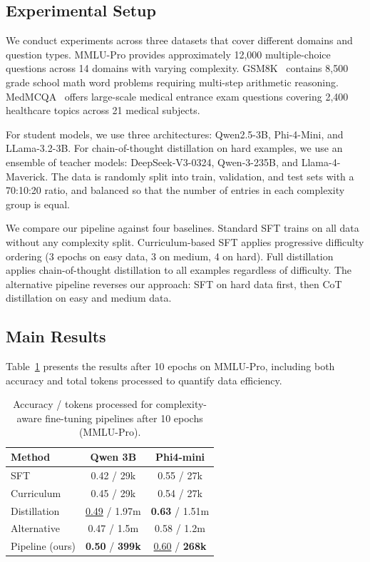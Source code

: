 \subsection{Experimental Setup}

We conduct experiments across three datasets that cover different domains and question types. MMLU-Pro provides approximately 12,000 multiple-choice questions across 14 domains with varying complexity. GSM8K~\cite{cobbe2021gsm8k} contains 8,500 grade school math word problems requiring multi-step arithmetic reasoning. MedMCQA~\cite{pmlr-v174-pal22a} offers large-scale medical entrance exam questions covering 2,400 healthcare topics across 21 medical subjects.

For student models, we use three architectures: Qwen2.5-3B, Phi-4-Mini, and LLama-3.2-3B. For chain-of-thought distillation on hard examples, we use an ensemble of teacher models: DeepSeek-V3-0324, Qwen-3-235B, and Llama-4-Maverick. The data is randomly split into train, validation, and test sets with a 70:10:20 ratio, and balanced so that the number of entries in each complexity group is equal.

We compare our pipeline against four baselines. Standard SFT trains on all data without any complexity split. Curriculum-based SFT applies progressive difficulty ordering (3 epochs on easy data, 3 on medium, 4 on hard). Full distillation applies chain-of-thought distillation to all examples regardless of difficulty. The alternative pipeline reverses our approach: SFT on hard data first, then CoT distillation on easy and medium data.

\subsection{Main Results}

Table~\ref{tab:finetuning_10epochs} presents the results after 10 epochs on MMLU-Pro, including both accuracy and total tokens processed to quantify data efficiency.

\begin{table}[!htb]
    \centering
    \caption{Accuracy / tokens processed for complexity-aware fine-tuning pipelines after 10 epochs (MMLU-Pro).}
    \begin{tabular}{lcc}
    \toprule
    Method & Qwen 3B & Phi4-mini \\
    \midrule
    SFT & 0.42 / 29k & 0.55 / 27k \\
    Curriculum & 0.45 / 29k & 0.54 / 27k \\
    Distillation & \underline{0.49} / 1.97m & \textbf{0.63} / 1.51m \\
    Alternative & 0.47 / 1.5m & 0.58 / 1.2m \\
    Pipeline (ours) & \textbf{0.50} / \textbf{399k} & \underline{0.60} / \textbf{268k} \\
    \bottomrule
    \end{tabular}
    \label{tab:finetuning_10epochs}
\end{table}

